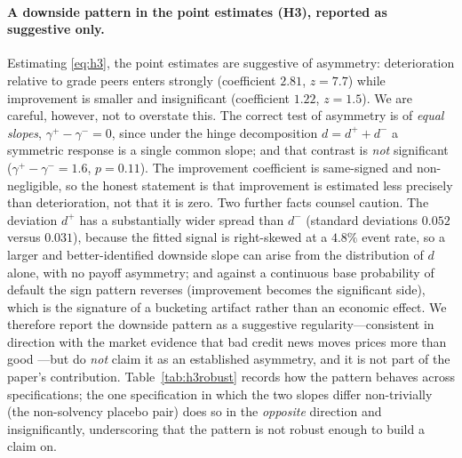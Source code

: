 \documentclass[pdflatex,sn-mathphys-ay]{sn-jnl}
\begin{document}
\paragraph{A downside pattern in the point estimates (H3), reported as suggestive only.} Estimating
\eqref{eq:h3}, the point estimates are suggestive of asymmetry: deterioration relative to grade peers
enters strongly (coefficient $2.81$, $z=7.7$) while improvement is smaller and insignificant
(coefficient $1.22$, $z=1.5$). We are careful, however, not to overstate this. The correct test of
asymmetry is of \emph{equal slopes}, $\gamma^{+}-\gamma^{-}=0$, since under the hinge decomposition
$d=d^{+}+d^{-}$ a symmetric response is a single common slope; and that contrast is \emph{not}
significant ($\gamma^{+}-\gamma^{-}=1.6$, $p=0.11$). The improvement coefficient is same-signed and
non-negligible, so the honest statement is that improvement is estimated less precisely than
deterioration, not that it is zero. Two further facts counsel caution. The deviation $d^{+}$ has a
substantially wider spread than $d^{-}$ (standard deviations $0.052$ versus $0.031$), because the fitted
signal is right-skewed at a $4.8\%$ event rate, so a larger and better-identified downside slope can
arise from the distribution of $d$ alone, with no payoff asymmetry; and against a continuous base
probability of default the sign pattern reverses (improvement becomes the significant side), which is
the signature of a bucketing artifact rather than an economic effect. We therefore report the downside
pattern as a suggestive regularity---consistent in direction with the market evidence that bad credit
news moves prices more than good \citep{holthausen1986,dichev2001}---but do \emph{not} claim it as an
established asymmetry, and it is not part of the paper's contribution. Table~\ref{tab:h3robust} records
how the pattern behaves across specifications; the one specification in which the two slopes differ
non-trivially (the non-solvency placebo pair) does so in the \emph{opposite} direction and
insignificantly, underscoring that the pattern is not robust enough to build a claim on.
\end{document}
